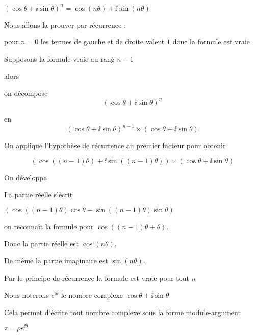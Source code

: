 $
  \left( \cos \theta + \ii \sin \theta \right)^n = \cos \left( n \theta \right)
  + \ii  \sin \left( n \theta \right)$


\change


Nous allons la prouver par récurrence :
  
pour $n=0$ les termes de gauche et de droite  valent $1$ donc la formule est vraie

\change

Supposons la formule vraie au rang $n-1$

alors 

on décompose 
$$
    \left( \cos \theta + \ii  \sin \theta \right)^n$$

en $$( \cos \theta + \ii \sin \theta)^{n-1}
 \times \left( \cos \theta + \ii  \sin \theta \right)
$$

\change

On applique l'hypothèse de récurrence au premier facteur
pour obtenir

$$ \left( \cos \left(
    \left( n - 1 \right) \theta \right) + \ii  \sin \left( \left( n - 1 \right)
    \theta \right) \right) \times \left( \cos \theta + \ii  \sin \theta \right)
$$


\change

On développe


\change

La partie réelle s'écrit 

$\left( \cos \left( \left( n - 1 \right) \theta \right) \cos \theta
    - \sin \left( \left( n - 1 \right) \theta \right) \sin \theta \right) $

on reconnaît la formule pour $\cos( (n-1)\theta + \theta )$.

Donc la partie réelle est $\cos (n\theta)$.

De même la partie imaginaire est $\sin(n\theta)$.


\change

Par le principe de récurrence la formule est vraie pour tout $n$





\diapo


Nous noterons $e^{\ii \theta}$ le nombre complexe $\cos \theta + \ii \sin \theta$

\change

Cela permet d'écrire tout nombre complexe sous la forme module-argument

$z = \rho e^{\ii \theta}$

